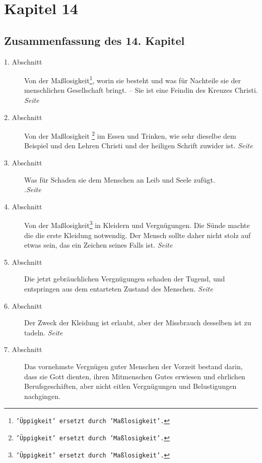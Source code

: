 
\chapter{Kapitel 14} \label{kap14}

\section{Zusammenfassung des 14. Kapitel}

\begin{description}
\item[1. Abschnitt] Von der Maßlosigkeit\footnote{\texttt{'Üppigkeit' ersetzt durch 'Maßlosigkeit'.}},
worin sie besteht und was für Nachteile
sie der menschlichen Gesellschaft bringt. -- Sie ist eine Feindin des Kreuzes
Christi.
\dotfill \textit{Seite~\pageref{kap14_ab1}}\\
\item[2. Abschnitt] Von der Maßlosigkeit
\footnote{\texttt{'Üppigkeit' ersetzt durch 'Maßlosigkeit'.}}
im Essen und Trinken, wie sehr dieselbe
dem Beispiel und den Lehren Christi und der heiligen Schrift zuwider ist.
\dotfill \textit{Seite~\pageref{kap14_ab2}}\\
\item[3. Abschnitt] Was für Schaden sie dem Menschen an Leib und Seele zufügt.\\
.\dotfill \textit{Seite~\pageref{kap14_ab3}}\\
\item[4. Abschnitt] Von der Maßlosigkeit\footnote{\texttt{'Üppigkeit' ersetzt
durch 'Maßlosigkeit'.}} in Kleidern und Vergnügungen. Die Sünde
machte die die erste Kleidung notwendig. Der Mensch sollte daher nicht stolz auf
etwas sein, das ein Zeichen seines Falls ist.
\dotfill \textit{Seite~\pageref{kap14_ab4}}\\
\item[5. Abschnitt] Die jetzt gebräuchlichen Vergnügungen schaden der Tugend,
und
entspringen aus dem entarteten Zustand des Menschen.
\dotfill \textit{Seite~\pageref{kap14_ab5}}\\
\item[6. Abschnitt] Der Zweck der Kleidung ist erlaubt, aber der Missbrauch
desselben ist zu tadeln.
\dotfill \textit{Seite~\pageref{kap14_ab6}}\\
\item[7. Abschnitt] Das vornehmste Vergnügen guter Menschen der Vorzeit bestand
darin, dass sie Gott dienten, ihren Mitmenschen Gutes erwiesen und ehrlichen
Berufsgeschäften, aber nicht eitlen Vergnügungen und Belustigungen nachgingen.

\end{description}
